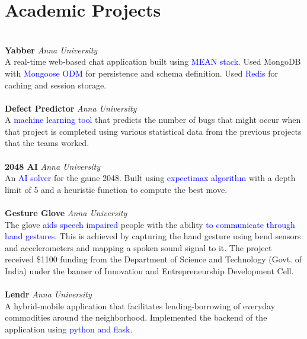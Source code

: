 \documentclass{resume}
\begin{document}
\section*{Academic Projects}
\titlerule
\noindent
\\
\textbf{Yabber} \hfill \textit{Anna University} \\
A real-time web-based chat application built using \textcolor{blue}{MEAN stack}. Used MongoDB with \textcolor{blue}{Mongoose ODM} for persistence and schema definition. Used \textcolor{blue}{Redis} for caching and session storage.  \\
\\
\textbf{Defect Predictor} \hfill \textit{Anna University} \\
A \textcolor{blue}{machine learning tool} that predicts the number of bugs that might occur when that project is completed using various statistical data from the previous projects that the teams worked.\\
\\
\textbf{2048 AI} \hfill \textit{Anna University} \\
An \textcolor{blue}{AI solver} for the game 2048. Built using \textcolor{blue}{expectimax algorithm} with a depth limit of 5 and a heuristic function to compute the best move. \\
\\
\textbf{Gesture Glove} \hfill \textit{Anna University} \\
The glove \textcolor{blue}{aids speech impaired} people with the ability \textcolor{blue}{to communicate through hand gestures}. This is achieved by capturing the hand gesture using bend sensors and accelerometers and mapping a spoken sound signal to it. The project received \$1100 funding from the Department of Science and Technology (Govt. of India) under the banner of Innovation and Entrepreneurship Development Cell.\\
\\
\textbf{Lendr} \hfill \textit{Anna University} \\
A hybrid-mobile application that facilitates lending-borrowing of everyday commodities around the neighborhood. Implemented the backend of the application using \textcolor{blue}{python and flask}.
\end{document}
